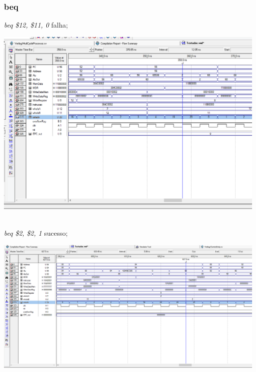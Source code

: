\documentclass{article}
\begin{document}
    \subsubsection{beq}
    {\it beq \$12, \$11, 0} falha;\\
    \begin{center}
        \includegraphics[scale=0.25]{beqfalha.PNG}
    \end{center}
    \\
    {\it beq \$2, \$2, 1} sucesso;\\
    \begin{center}
        \includegraphics[scale=0.25]{beqsucesso.PNG}
    \end{center}
    
    \\
\end{document}
